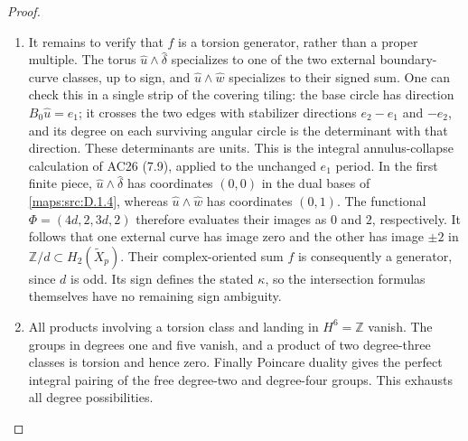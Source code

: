 \begin{proof}
\begin{enumerate}[label=\arabic*.,leftmargin=*]
\item It remains to verify that $f$ is a torsion generator, rather than a
proper multiple. The torus $\widehat u\wedge\widehat\delta$ specializes
to one of the two external boundary-curve classes, up to sign, and
$\widehat u\wedge\widehat w$ specializes to their signed sum. One
can check this in a single strip of the covering tiling: the base
circle has direction $B_0\widehat u=e_1$; it crosses the two edges
with stabilizer directions $e_2-e_1$ and $-e_2$, and its degree on
each surviving angular circle is the determinant with that direction.
These determinants are units. This is the integral annulus-collapse
calculation of AC26 (7.9), applied to the unchanged $e_1$ period.
In the first finite piece, $\widehat u\wedge\widehat\delta$ has
coordinates $(0,0)$ in the dual bases of \ref{maps:src:D.1.4}, whereas
$\widehat u\wedge\widehat w$ has coordinates $(0,1)$.
The functional $\Phi=(4d,2,3d,2)$ therefore evaluates their images
as $0$ and $2$, respectively. It follows that one external curve
has image zero and the other has image $\pm2$ in
$\mathbb Z/d\subset H_2(\widetilde X_p)$. Their complex-oriented
sum $f$ is consequently a generator, since $d$ is odd. Its sign
defines the stated $\kappa$, so the intersection formulas themselves
have no remaining sign ambiguity.

\item All products involving a torsion class and landing in $H^6=\mathbb Z$
vanish. The groups in degrees one and five vanish, and a product of
two degree-three classes is torsion and hence zero. Finally Poincare
duality gives the perfect integral pairing of the free degree-two
and degree-four groups. This exhausts all degree possibilities.
\end{enumerate}
\end{proof}

